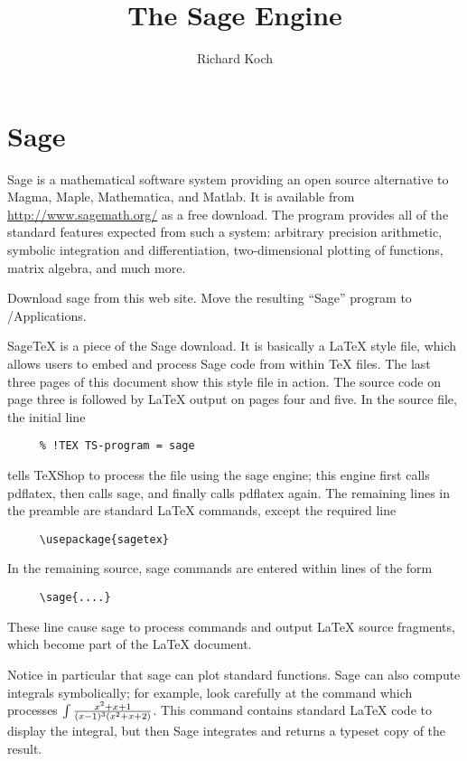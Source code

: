 \documentclass[11pt, oneside]{amsart}
\title{The Sage Engine}
\author{Richard Koch}
\begin{document}
\maketitle
\vspace{-.3in}
\section{Sage}
Sage is a mathematical software system providing an open source alternative to Magma, Maple, Mathematica, and Matlab. It is available from 
\url{http://www.sagemath.org/} as a free download. The program provides all of the standard features expected from such a system: arbitrary precision arithmetic, symbolic integration and differentiation, two-dimensional plotting of functions, matrix algebra, and much more.

Download sage from this web site. Move the resulting ``Sage'' program to /Applications. 

SageTeX is a piece of the Sage download. It is basically a LaTeX style file, which  allows users to embed and process Sage code from within TeX files. The last three pages of this document show this style file in action. The source code on page three is followed by LaTeX output on pages four and five. In the source file, the initial line
\begin{verbatim}
     % !TEX TS-program = sage
\end{verbatim}
tells TeXShop to process the file using the sage engine; this engine first calls pdflatex, then calls sage, and finally calls pdflatex again.
The remaining lines in the preamble are standard LaTeX commands, except the required line
\begin{verbatim}
     \usepackage{sagetex}
\end{verbatim}
In the remaining source, sage commands are entered within lines of the form
\begin{verbatim}
     \sage{....}
\end{verbatim}
These line cause sage to process commands and output LaTeX source fragments, which become part of the LaTeX document.

Notice in particular that sage can plot standard functions. Sage can also compute integrals symbolically; for example, look carefully at the command which processes $\int {{x^2 + x + 1} \over {(x - 1)^3 (x^2 + x + 2)}}$. This command contains standard LaTeX code to display the integral, but then Sage integrates and returns a typeset copy of the result.

\newpage
\end{document}
